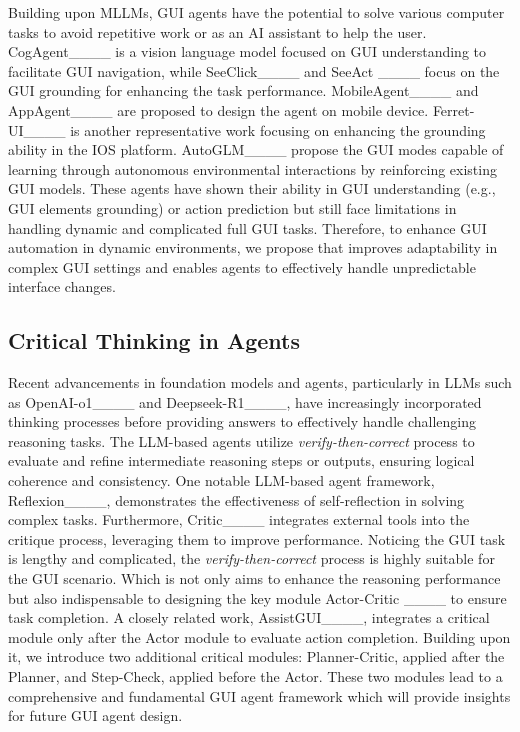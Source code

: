 Building upon MLLMs, GUI agents have the potential to solve various computer tasks to avoid repetitive work or as an AI assistant to help the user. CogAgent____ is a vision language model focused on GUI understanding to facilitate GUI navigation, while SeeClick____ and SeeAct ____ focus on the GUI grounding for enhancing the task performance. MobileAgent____ and AppAgent____ are proposed to design the agent on mobile device. Ferret-UI____ is another representative work focusing on enhancing the grounding ability in the IOS platform. AutoGLM____ propose the GUI modes capable of learning through autonomous environmental interactions by reinforcing existing GUI models. These agents have shown their ability in GUI understanding (e.g., GUI elements grounding) or action prediction but still face limitations in handling dynamic and complicated full GUI tasks. 
Therefore, to enhance GUI automation in dynamic environments, we propose \agent{} that improves adaptability in complex GUI settings and enables agents to effectively handle unpredictable interface changes.


\subsection{Critical Thinking in Agents}

Recent advancements in foundation models and agents, particularly in LLMs such as OpenAI-o1____ and Deepseek-R1____, have increasingly incorporated thinking processes before providing answers to effectively handle challenging reasoning tasks. The LLM-based agents utilize \textit{verify-then-correct} process to evaluate and refine intermediate reasoning steps or outputs, ensuring logical coherence and consistency. One notable LLM-based agent framework, Reflexion____, demonstrates the effectiveness of self-reflection in solving complex tasks. Furthermore, Critic____ integrates external tools into the critique process, leveraging them to improve performance. Noticing the GUI task is lengthy and complicated, the \textit{verify-then-correct} process is highly suitable for the GUI scenario. Which is not only aims to enhance the reasoning performance but also indispensable to designing the key module Actor-Critic ____ to ensure task completion.  A closely related work, AssistGUI____, integrates a critical module only after the Actor module to evaluate action completion. Building upon it, we introduce two additional critical modules: Planner-Critic, applied after the Planner, and Step-Check, applied before the Actor. These two modules lead to a comprehensive and fundamental GUI agent framework \textbf{\agent{}} which will provide insights for future GUI agent design.